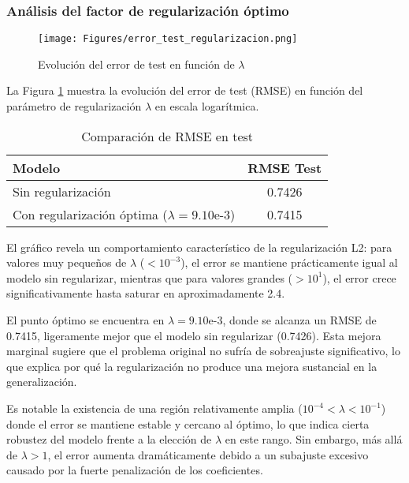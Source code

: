 \documentclass{tp02}
\begin{document}
\subsubsection{Análisis del factor de regularización óptimo}

\begin{figure}[H]
\centering
\texttt{[image: Figures/error\_test\_regularizacion.png]}

\caption{Evolución del error de test en función de $\lambda$}
\label{fig:error_test_regularizacion}
\end{figure}

La Figura \ref{fig:error_test_regularizacion} muestra la evolución del 
error de test (RMSE) en función del parámetro de regularización $\lambda$ 
en escala logarítmica. 

\begin{table}[h]
\centering
\begin{tabular}{|l|c|}
\hline
Modelo & RMSE Test \\
\hline
Sin regularización & 0.7426 \\
Con regularización óptima ($\lambda=9.10\text{e-}3$) & 0.7415 \\
\hline
\end{tabular}
\caption{Comparación de RMSE en test}
\label{tab:rmse_comparison}
\end{table}

El gráfico revela un comportamiento característico de la regularización 
L2: para valores muy pequeños de $\lambda$ ($<10^{-3}$), el error se 
mantiene prácticamente igual al modelo sin regularizar, mientras que 
para valores grandes ($>10^1$), el error crece significativamente hasta 
saturar en aproximadamente 2.4.

El punto óptimo se encuentra en $\lambda = 9.10\text{e-}3$, donde se 
alcanza un RMSE de 0.7415, ligeramente mejor que el modelo sin 
regularizar (0.7426). Esta mejora marginal sugiere que el problema 
original no sufría de sobreajuste significativo, lo que explica por qué 
la regularización no produce una mejora sustancial en la generalización.

Es notable la existencia de una región relativamente amplia 
($10^{-4} < \lambda < 10^{-1}$) donde el error se mantiene estable y 
cercano al óptimo, lo que indica cierta robustez del modelo frente a la 
elección de $\lambda$ en este rango. Sin embargo, más allá de 
$\lambda > 1$, el error aumenta dramáticamente debido a un subajuste 
excesivo causado por la fuerte penalización de los coeficientes.
\end{document}
